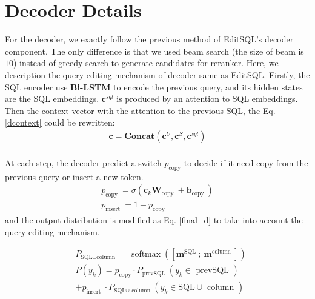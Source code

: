 \documentclass[letterpaper]{article} \usepackage{aaai21}  \usepackage{times}  \usepackage{helvet} \usepackage{courier}  \usepackage[hyphens]{url}  \usepackage{graphicx} \urlstyle{rm} \def\UrlFont{\rm}  \usepackage{natbib}  \usepackage{caption} \frenchspacing  \setlength{\pdfpagewidth}{8.5in}  \setlength{\pdfpageheight}{11in}
\begin{document}
\section{Decoder Details}
For the decoder, we exactly follow the previous method of EditSQL’s \cite{DBLP:conf/emnlp/ZhangYESXLSXSR19} decoder component.
The only difference is that we used beam search (the size of beam is $10$) instead of greedy search to generate candidates for reranker.
Here, we description the query editing mechanism of decoder same as EditSQL.
Firstly, the SQL encoder use \textbf{Bi-LSTM} to encode the previous query, and its hidden states are the SQL embeddings.
$\mathbf{c}^{sql}$ is produced by an attention to SQL embeddings.
Then the context vector with the attention to the previous SQL, the Eq. \ref{dcontext} could be rewritten:
\begin{equation}
\begin{aligned}
\mathbf{c} = \mathbf{Concat}(\mathbf{c}^U, \mathbf{c}^S, \mathbf{c}^{sql} ) \\
\end{aligned}
\end{equation}

At each step, the decoder predict a switch $p_{\text {copy}}$ to decide if it need copy from the previous query or insert a new token.
\begin{equation}
\begin{array}{l}
p_{\text {copy }}=\sigma\left(\mathbf{c}_{k} \mathbf{W}_{\text {copy }}+\mathbf{b}_{\text {copy }}\right) \\
p_{\text {insert }}=1-p_{\text {copy }}
\end{array}
\end{equation}
and the output distribution is modified as Eq. \ref{final_d} to take into account the query editing mechanism.

\begin{equation}
\begin{aligned}
& P_{\text {SQL} \cup \text {column }} =\operatorname{softmax}\left(\left[\mathbf{m}^{\text {SQL }} ; \mathbf{~ m}^{\text {column }}\right]\right) \\
& P\left(y_{k}\right)=p_{\text {copy}} \cdot P_{\text {prevSQL }}\left(y_{k} \in \text { prevSQL }\right) \\
& +p_{\text {insert }} \cdot P_{\text {SQL} \cup \text { column }}\left(y_{k} \in \mathrm{SQL} \cup \text { column }\right)
\end{aligned}
\label{final_d}
\end{equation}
\end{document}

